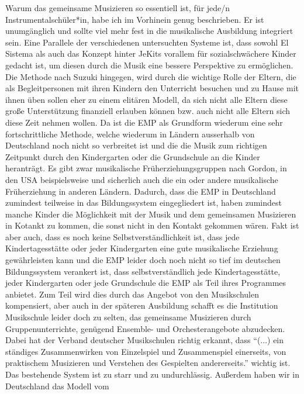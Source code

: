 
Warum das gemeinsame Musizieren so essentiell ist, für jede/n
Instrumentalschüler*in, habe ich im Vorhinein genug beschrieben. Er ist
unumgänglich und sollte viel mehr fest in die musikalische Ausbildung integriert
sein. Eine Parallele der verschiedenen untersuchten Systeme ist, dass sowohl El
Sistema als auch das Konzept hinter JeKits vorallem für sozialschwächere Kinder
gedacht ist, um diesen durch die Musik eine bessere Perspektive zu ermöglichen.
Die Methode nach Suzuki hingegen, wird durch die wichtige Rolle der Eltern, die
als Begleitpersonen mit ihren Kindern den Unterricht besuchen und zu Hause mit
ihnen üben sollen eher zu einem elitären Modell, da sich nicht alle Eltern diese
große Unterstützung finanziell erlauben können bzw. auch nicht alle Eltern sich
diese Zeit nehmen wollen. Da ist die EMP als Grundform wiederum eine sehr
fortschrittliche Methode, welche wiederum in Ländern ausserhalb von Deutschland
noch nicht so verbreitet ist und die die Musik zum richtigen Zeitpunkt durch den
Kindergarten oder die Grundschule an die Kinder heranträgt. Es gibt zwar
musikalische Früherziehungsgruppen nach Gordon, in den USA beispielsweise und
sicherlich auch die ein oder andere musikalische Früherziehung in anderen
Ländern. Dadurch, dass die EMP in Deutschland zumindest teilweise in das
Bildungssystem eingegliedert ist, haben zumindest manche Kinder die Möglichkeit
mit der Musik und dem gemeinsamen Musizieren in Kotankt zu kommen, die sonst
nicht in den Kontakt gekommen wären. Fakt ist aber auch, dass es noch keine
Selbstverständlichkeit ist, dass jede Kindertagesstätte oder jeder Kindergarten
eine gute musikalische Erziehung gewährleisten kann und die EMP leider doch noch
nicht so tief im deutschen Bildungssystem verankert ist, dass selbstverständlich
jede Kindertagesstätte, jeder Kindergarten oder jede Grundschule die EMP als
Teil ihres Programmes anbietet. Zum Teil wird dies durch das Angebot von den
Musikschulen kompensiert, aber auch in der späteren Ausbildung schafft es die
Institution Musikschule leider doch zu selten, das gemeinsame Musizieren durch
Gruppenunterrichte, genügend Ensemble- und Orchesterangebote abzudecken. Dabei
hat der Verband deutscher Musikschulen richtig erkannt, dass \enquote{(...) ein
ständiges Zusammenwirken von Einzelspiel und Zusammenspiel einerseits, von
praktischem Musizieren und Verstehen des Gespielten andererseits.} wichtig ist.
\autocite[22]{losert:die_kunst_zu_unterrichten} Das bestehende System ist zu
starr und zu undurchlässig. Außerdem haben wir in Deutschland das Modell vom
